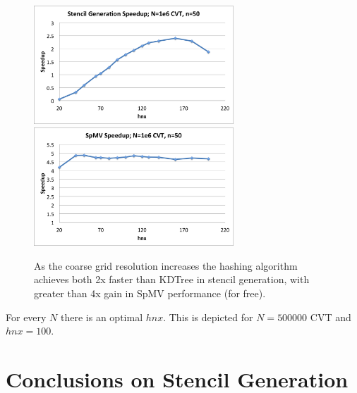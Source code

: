 \documentclass{report}
\begin{document}
\begin{figure}
\centering
\includegraphics[width=7.5cm]{../figures/stencils/cvt1m_stencil_gen_speedup.png}
\includegraphics[width=7.5cm]{../figures/stencils/cvt1m_spmv_speedup.png} 
\caption{As the coarse grid resolution increases the hashing algorithm achieves both 2x faster than KDTree in stencil generation, with greater than 4x gain in SpMV performance (for free).}
\label{fig:hash_results}
\end{figure}

For every $N$ there is an optimal $hnx$. This is depicted for $N=500000$ CVT and $hnx=100$. 



\section{Conclusions on Stencil Generation}



\ifstandalone


\end{document}
